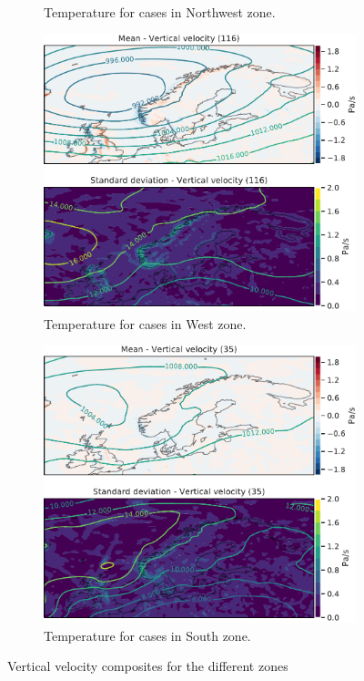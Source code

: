 \begin{figure}
\begin{subfigure}[b]{0.49\textwidth}
    \caption{Temperature for cases in Northwest zone.}
    \label{fig:NordWestW}
\end{subfigure}
\begin{subfigure}[b]{0.49\textwidth}
    \centering
    \includegraphics[width=\textwidth]{Figures/WVest.pdf}
    \caption{Temperature for cases in West zone.}
    \label{fig:WestW}
\end{subfigure}
\begin{subfigure}[b]{0.49\textwidth}
    \centering
    \includegraphics[width=\textwidth]{Figures/WSor.pdf}
    \caption{Temperature for cases in South zone.}
    \label{fig:SouthW}
\end{subfigure}
\caption{Vertical velocity composites for the different zones}
\label{fig:verticalzones}
\end{figure}

